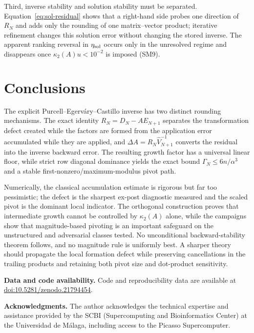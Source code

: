 \documentclass[review,onefignum,onetabnum]{siamart251216}
\begin{document}
Third, inverse stability and solution stability must be separated.  Equation~\eqref{eq:sol-residual}
shows that a right-hand side probes one direction of $R_N$ and adds only the rounding of one
matrix--vector product; iterative refinement changes this solution error without changing the stored
inverse.  The apparent ranking reversal in $\eta_{\rm sol}$ occurs only in the unresolved regime and
disappears once $\kappa_2(A)u<10^{-2}$ is imposed (SM9).

\section{Conclusions}
\label{sec:conclusions}

The explicit Purcell--Egerv\'ary--Castillo inverse has two distinct rounding mechanisms.  The exact
identity $R_N=D_N-AE_{N+1}$ separates the transformation defect created while the factors are formed
from the application error accumulated while they are applied, and
$\Delta A=R_N\widehat V_{N+1}^{-1}$ converts the residual into the inverse backward error.  The
resulting growth factor has a universal linear floor, while strict row diagonal dominance yields the
exact bound $\Gamma_N\le6n/\alpha^3$ and a stable first-nonzero/maximum-modulus pivot path.

Numerically, the classical accumulation estimate is rigorous but far too pessimistic; the defect is
the sharpest ex-post diagnostic measured and the scaled pivot is the dominant local indicator.  The
orthogonal construction proves that intermediate growth cannot be controlled by $\kappa_2(A)$
alone, while the campaigns show that magnitude-based pivoting is an important safeguard on the
unstructured and adversarial classes tested.  No unconditional backward-stability theorem follows,
and no magnitude rule is uniformly best.  A sharper theory should propagate the local formation
defect while preserving cancellations in the trailing products and retaining both pivot size and
dot-product sensitivity.

\par\medskip
\noindent\textbf{Data and code availability.} Code and reproducibility data are available at \href{https://doi.org/10.5281/zenodo.21794454}{doi:10.5281/zenodo.21794454}.
\par

\par\medskip
\noindent\textbf{Acknowledgments.}
The author acknowledges the technical expertise and assistance provided by the SCBI (Supercomputing and Bioinformatics Center) at the Universidad de M\'alaga, including access to the Picasso Supercomputer.
\par



\end{document}
